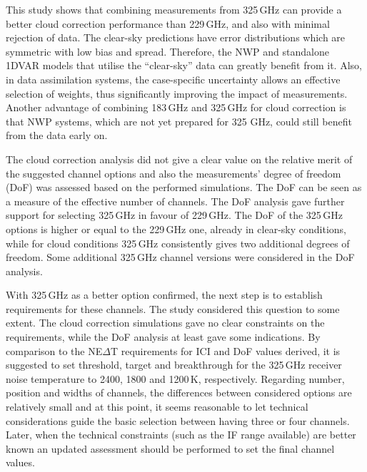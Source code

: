 \documentclass[12pt]{article}
\begin{document}
This study shows that combining measurements from 325\,GHz can provide a better
cloud correction performance than 229\,GHz, and also with minimal rejection of
data. The clear-sky predictions have error distributions which are symmetric
with low bias and spread. Therefore, the NWP and standalone 1DVAR models that
utilise the ``clear-sky'' data can greatly benefit from it. Also, in data
assimilation systems, the case-specific uncertainty allows an effective
selection of weights, thus significantly improving the impact of measurements.
Another advantage of combining 183\,GHz and 325\,GHz for cloud correction is
that NWP systems, which are not yet prepared for 325 GHz, could still benefit
from the data early on. 

The cloud correction analysis did not give a clear value on the relative merit
of the suggested channel options and also the measurements' degree of freedom
(DoF) was assessed based on the performed simulations. The DoF can be seen as a
measure of the effective number of channels. The DoF analysis gave further
support for selecting 325\,GHz in favour of 229\,GHz. The DoF of the 325\,GHz
options is higher or equal to the 229\,GHz one, already in clear-sky conditions,
while for cloud conditions 325\,GHz consistently gives two additional degrees
of freedom. Some additional 325\,GHz channel versions were considered in the DoF
analysis.

With 325\,GHz as a better option confirmed, the next step is to establish
requirements for these channels. The study considered this question to some
extent. The cloud correction simulations gave no clear constraints on the
requirements, while the DoF analysis at least gave some indications. By
comparison to the NE$\Delta$T requirements for ICI and DoF values derived, it
is suggested to set threshold, target and breakthrough for the 325\,GHz
receiver noise temperature to 2400, 1800 and 1200\,K, respectively. Regarding
number, position and widths of channels, the differences between considered
options are relatively small and at this point, it seems reasonable to let
technical considerations guide the basic selection between having three or four
channels. Later, when the technical constraints (such as the IF range
available) are better known an updated assessment should be performed to set
the final channel values.

\vspace{10mm}
\setcounter{tocdepth}{1} 
\tableofcontents


\newpage
{}
\setcounter{page}{1}
\end{document}
